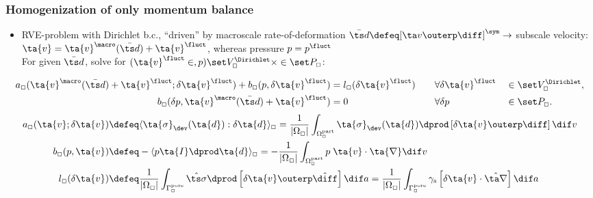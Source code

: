 \documentclass[11pt]{beamer} %
\newcommand{\pore}{\mathrm{pore}}
\newcommand{\particle}{\mathrm{part}}
\newcommand{\surf}{\mathrm{s}}
\begin{document}
\begin{frame}
 \frametitle{Homogenization of only momentum balance}
 \begin{itemize}
    \item RVE-problem with Dirichlet b.c., ``driven'' by macroscale
    rate-of-deformation $\bar{\ts d} \defeq [\ta v\outerp\diff]^\sym\rightarrow$ subscale velocity:
    $\ta{v}=\ta{v}^\macro(\bar{\ts d})+\ta{v}^\fluct$, whereas pressure $p = p^\fluct$\\
    For given $\bar{\ts d}$, solve for $(\ta{v}^\fluct\in,p) \set V_{\Box}^{\Dirichlet}\times\in\set P_{\Box}$:
   \vspace{-2.5truemm}
 \end{itemize}
\begin{alignat*}{3}
    a_{\Box}(\ta{v}^\macro(\bar{\ts d})+\ta{v}^\fluct;\delta \ta{v}^\fluct) +  b_{\Box}(p,\delta\ta{v}^\fluct)
    & = 
    l_{\Box}(\delta \ta{v}^\fluct)
    & \quad & \forall \delta \ta{v}^\fluct &&\in\set V_{\Box}^{\Dirichlet},
    \\
    b_{\Box}(\delta p,\ta{v}^\macro(\bar{\ts d})+\ta{v}^\fluct)
    & = 
    0
    & \quad & \forall \delta p &&\in\set P_{\Box}.
\end{alignat*}
   \vspace{-2.5truemm}
\begin{align*}
    a_\Box(\ta{v};\delta \ta{v})
    & \defeq
    \langle\ta{\sigma}_\dev(\ta{d}) : \delta \ta{d}\rangle_{\Box} =
    \frac{1}{|\Omega_\Box|}\int_{\Omega^\particle_\Box} \ta{\sigma}_\dev(\ta{d}) \dprod \left[\delta \ta{v} \outerp \diff\right] \dif v
\\
    b_\Box(p, \ta{v})
    & \defeq
    - \langle p\ta{I} \dprod \ta{d}\rangle_{\Box} =
    - \frac{1}{|\Omega_\Box|}\int_{\Omega^\particle_\Box} p\;\ta{v}\cdot \ta{\nabla} \dif v
\\
    l_\Box(\delta \ta{v})
    & \defeq
    \frac{1}{|\Omega_{\Box}|} \int_{\Gamma_{\Box}^\pore} \hat{\ts\sigma}\dprod\left[\delta\ta{v}\outerp\hat{\diff}\right] \dif a =
    \frac{1}{|\Omega_{\Box}|} \int_{\Gamma_{\Box}^\pore}
  \gamma_\surf\left[\delta\ta{v}\cdot\hat{\ta\nabla}\right] \dif a
\end{align*}
\end{frame}
\end{document}
